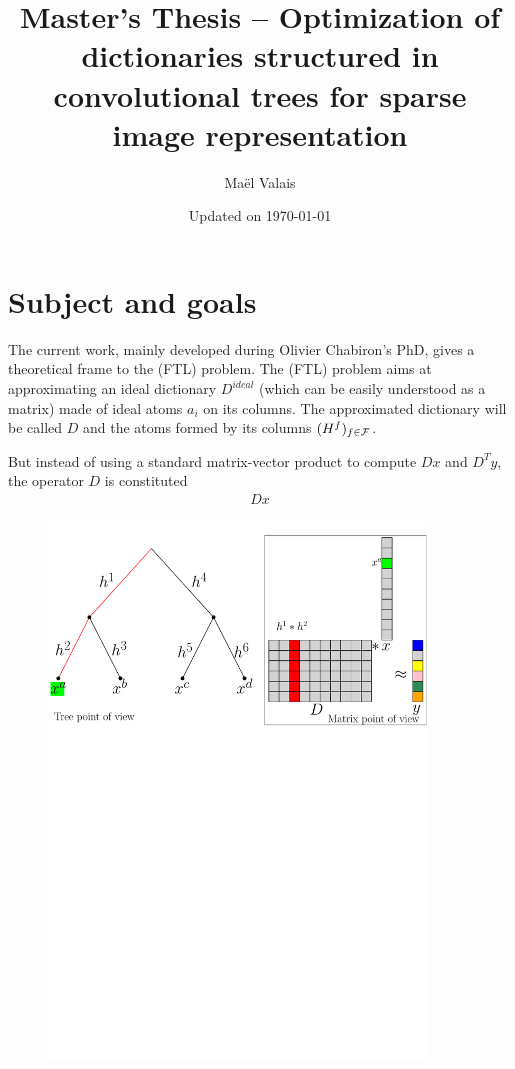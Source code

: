 \author{Maël Valais}
\date{Updated on \today}
\title{Master's Thesis – Optimization of dictionaries structured in convolutional trees for sparse image representation}


\section{Subject and goals}

The current work, mainly developed during Olivier Chabiron's PhD, gives a theoretical frame to the (FTL) problem. The (FTL) problem aims at approximating an ideal dictionary $D^{ideal}$ (which can be easily understood as a matrix) made of ideal atoms $a_i$ on its columns. The approximated dictionary will be called $D$ and the atoms formed by its columns $(H^f)_{f \in \mathcal F}$. 

But instead of using a standard matrix-vector product to compute $Dx$ and $D^Ty$, the operator $D$ is constituted 
\begin{equation*} \begin{aligned}
Dx
\end{aligned} \end{equation*}


\begin{figure} \centering
\includegraphics[width=0.9\textwidth]{figures/matrix-vs-tree.pdf}
\end{figure}


